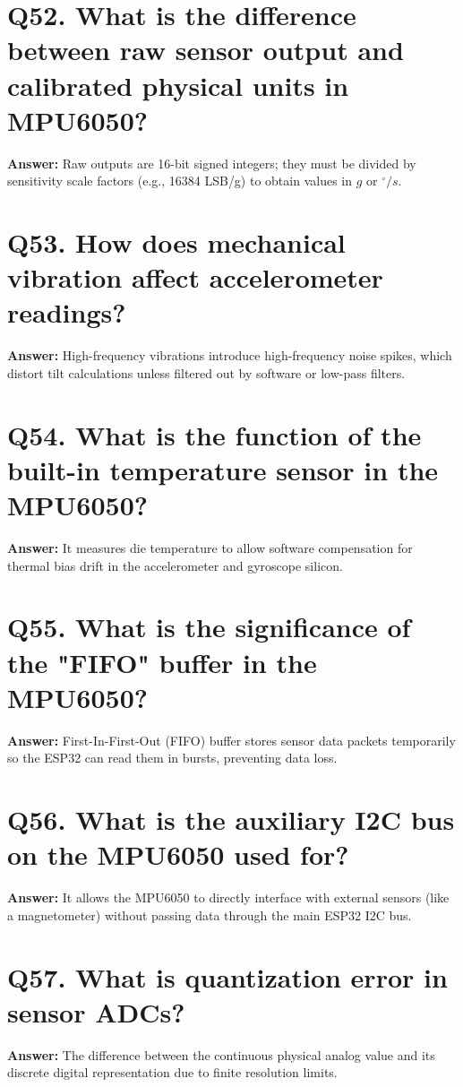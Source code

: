 \documentclass[12pt,a4paper,oneside]{report}
\begin{document}
\section{Q52. What is the difference between raw sensor output and calibrated physical units in MPU6050?}
\textbf{Answer:} Raw outputs are 16-bit signed integers; they must be divided by sensitivity scale factors (e.g., 16384 LSB/g) to obtain values in $g$ or $^{\circ}/s$.

\section{Q53. How does mechanical vibration affect accelerometer readings?}
\textbf{Answer:} High-frequency vibrations introduce high-frequency noise spikes, which distort tilt calculations unless filtered out by software or low-pass filters.

\section{Q54. What is the function of the built-in temperature sensor in the MPU6050?}
\textbf{Answer:} It measures die temperature to allow software compensation for thermal bias drift in the accelerometer and gyroscope silicon.

\section{Q55. What is the significance of the "FIFO" buffer in the MPU6050?}
\textbf{Answer:} First-In-First-Out (FIFO) buffer stores sensor data packets temporarily so the ESP32 can read them in bursts, preventing data loss.

\section{Q56. What is the auxiliary I2C bus on the MPU6050 used for?}
\textbf{Answer:} It allows the MPU6050 to directly interface with external sensors (like a magnetometer) without passing data through the main ESP32 I2C bus.

\section{Q57. What is quantization error in sensor ADCs?}
\textbf{Answer:} The difference between the continuous physical analog value and its discrete digital representation due to finite resolution limits.
\end{document}
